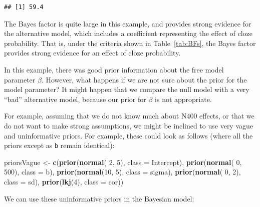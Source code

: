 \documentclass[12pt,]{krantz}
\newenvironment{Shaded}{\begin{snugshade}}{\end{snugshade}}
\newcommand{\KeywordTok}[1]{\textcolor[rgb]{0.13,0.29,0.53}{\textbf{#1}}}
\newcommand{\DataTypeTok}[1]{\textcolor[rgb]{0.13,0.29,0.53}{#1}}
\newcommand{\DecValTok}[1]{\textcolor[rgb]{0.00,0.00,0.81}{#1}}
\newcommand{\StringTok}[1]{\textcolor[rgb]{0.31,0.60,0.02}{#1}}
\newcommand{\NormalTok}[1]{#1}
\theoremstyle{definition}
\theoremstyle{definition}
\theoremstyle{definition}
\theoremstyle{remark}
\begin{document}
\begin{verbatim}
## [1] 59.4
\end{verbatim}

The Bayes factor is quite large in this example, and provides strong
evidence for the alternative model, which includes a coefficient
representing the effect of cloze probability. That is, under the
criteria shown in Table~\ref{tab:BFs}, the Bayes factor provides strong
evidence for an effect of cloze probability.

In this example, there was good prior information about the free model
parameter \(\beta\). However, what happens if we are not sure about the
prior for the model parameter? It might happen that we compare the null
model with a very ``bad'' alternative model, because our prior for
\(\beta\) is not appropriate.

For example, assuming that we do not know much about N400 effects, or
that we do not want to make strong assumptions, we might be inclined to
use very vague and uninformative priors. For example, these could look
as follows (where all the priors except as \texttt{b} remain identical):

\begin{Shaded}
\begin{Highlighting}[]
\NormalTok{priorsVague <-}\StringTok{ }\KeywordTok{c}\NormalTok{(}\KeywordTok{prior}\NormalTok{(}\KeywordTok{normal}\NormalTok{( }\DecValTok{2}\NormalTok{, }\DecValTok{5}\NormalTok{), }\DataTypeTok{class =}\NormalTok{ Intercept),}
               \KeywordTok{prior}\NormalTok{(}\KeywordTok{normal}\NormalTok{( }\DecValTok{0}\NormalTok{, }\DecValTok{500}\NormalTok{), }\DataTypeTok{class =}\NormalTok{ b),}
               \KeywordTok{prior}\NormalTok{(}\KeywordTok{normal}\NormalTok{(}\DecValTok{10}\NormalTok{, }\DecValTok{5}\NormalTok{), }\DataTypeTok{class =}\NormalTok{ sigma),}
               \KeywordTok{prior}\NormalTok{(}\KeywordTok{normal}\NormalTok{( }\DecValTok{0}\NormalTok{, }\DecValTok{2}\NormalTok{), }\DataTypeTok{class =}\NormalTok{ sd),}
               \KeywordTok{prior}\NormalTok{(}\KeywordTok{lkj}\NormalTok{(}\DecValTok{4}\NormalTok{), }\DataTypeTok{class =}\NormalTok{ cor))}
\end{Highlighting}
\end{Shaded}

We can use these uninformative priors in the Bayesian model:
\end{document}
